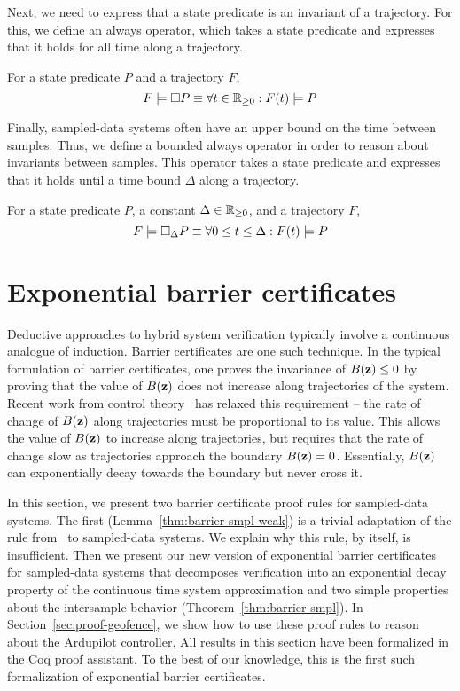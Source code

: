 Next, we need to express that a state predicate is an invariant of a
trajectory. For this, we define an always operator, which takes a state
predicate and expresses that it holds for all time along a trajectory.
\begin{definition}[Always]
For a state predicate $P$ and a trajectory $F$,
\[
F \models \Box{} P \equiv \forall t \in \mathbb{R}_{\geq 0} : F(t) \models P
\]
\label{def:always}
\end{definition}

Finally, sampled-data systems often have an upper bound on the time between
samples. Thus, we define a bounded always operator in order to reason about
invariants between samples. This operator takes a state predicate and
expresses that it holds until a time bound $\Delta$ along a trajectory.
\begin{definition}
For a state predicate $P$, a constant $\Delta \in \mathbb{R}_{\geq 0}$, and a trajectory $F$,
\[
F \models \Box{}_{\Delta} P \equiv \forall 0 \leq t \leq \Delta : F(t) \models P
\]
\label{def:bounded-always}
\end{definition}

\section{Exponential barrier certificates}
\label{sec:proof-barrier}
Deductive approaches to hybrid system verification typically involve a
continuous analogue of induction. Barrier certificates are one such
technique. In the typical formulation of barrier certificates, one proves
the invariance of $B(\mathbf{z}) \leq 0$ by proving that the value of
$B(\mathbf{z})$ does not increase along trajectories of the system. Recent
work from control theory~\cite{kong2013barrier} has relaxed this
requirement -- the rate of change of $B(\mathbf{z})$ along trajectories
must be proportional to its value. This allows the value of
$B(\mathbf{z})$ to increase along trajectories, but requires that the rate
of change slow as trajectories approach the boundary $B(\mathbf{z}) =
0$. Essentially, $B(\mathbf{z})$ can exponentially decay towards the
boundary but never cross it.

In this section, we present two barrier certificate proof rules for
sampled-data systems.  The first (Lemma~\ref{thm:barrier-smpl-weak}) is a
trivial adaptation of the rule from~\cite{kong2013barrier} to sampled-data
systems. We explain why this rule, by itself, is insufficient.  Then we
present our new version of exponential barrier certificates for
sampled-data systems that decomposes verification into an exponential decay
property of the continuous time system approximation and two simple
properties about the intersample behavior
(Theorem~\ref{thm:barrier-smpl}). In Section~\ref{sec:proof-geofence}, we
show how to use these proof rules to reason about the Ardupilot
controller. All results in this section have been formalized in the Coq
proof assistant. To the best of our knowledge, this is the first such
formalization of exponential barrier certificates.

